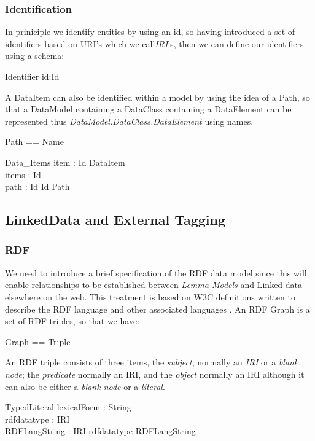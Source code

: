 \documentclass[a4paper,twoside]{article}
\begin{document}
\subsubsection{Identification}

In priniciple we identify entities by using an id, so having introduced a set of identifiers based on URI's which we call\emph{IRI}'s, then we can define our identifiers using a schema:
\begin{schema}{Identifier}
	id:Id\\
\end{schema}


A DataItem can also be identified within a model by using the idea of a Path, so that a DataModel containing a DataClass containing a DataElement can be represented thus \emph{DataModel.DataClass.DataElement} using names.

\begin{zed}
	Path == \seq Name 
\end{zed}

\begin{schema}{Data\_Items}
	item : Id \pfun DataItem \\
	items : \power Id \\
	path : Id \pfun Id \pfun Path 
\end{schema}

\subsection{LinkedData and External Tagging}

\subsubsection{RDF}

We need to introduce a brief specification of the RDF data model since this will enable relationships to be established between \emph{Lemma Models} and Linked data elsewhere on the web.  This treatment is based on W3C definitions written to describe the RDF language and other associated languages \cite{RDF, RDFAS, RDFTurtle, RDFS, RDFSEM, RDFSL}.  An RDF Graph is a set of RDF triples, so that we have:
\begin{zed} Graph == \power Triple
\end{zed}

An RDF triple consists of three items, the \emph{subject}, normally an \emph{IRI} or a \emph{blank node}; the \emph{predicate} normally an IRI, and the \emph{object} normally an IRI although it can also be either a \emph{blank node} or a \emph{literal}.
\begin{zed}
\end{zed}
\begin{schema}{TypedLiteral}
	lexicalForm : String \\
	rdfdatatype : IRI \\
	RDFLangString : IRI
	\where
	rdfdatatype \neq RDFLangString
\end{schema}
\end{document}
